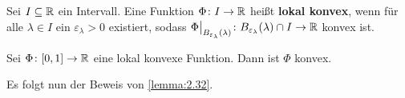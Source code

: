 \begin{definition}
\label{def:2.51}
	Sei $I \subseteq \mathbb{R}$ ein Intervall.
	Eine Funktion $\Phi \colon I \rightarrow \mathbb{R}$ heißt \textbf{lokal konvex}, wenn für alle $\lambda \in I$ ein $\varepsilon_\lambda > 0$ existiert, sodass $\Phi \big|_{B_{\varepsilon_\lambda}(\lambda)} \colon B_{\varepsilon_\lambda}(\lambda) \cap I \rightarrow \mathbb{R}$ konvex ist. 
\end{definition}

\begin{lemma}
\label{lemma:2.52}
	Sei $\Phi\colon [0,1] \rightarrow \mathbb{R}$ eine lokal konvexe Funktion.
	Dann ist $\Phi$ konvex.
\end{lemma}

Es folgt nun der Beweis von \autoref{lemma:2.32}.

